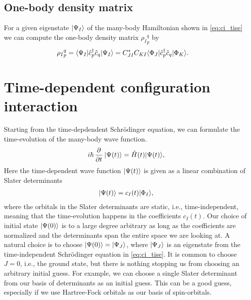         \subsection{One-body density matrix}
            For a given eigenstate $| \Psi_I \rangle$ of the many-body Hamiltonian
            shown in \autoref{eq:ci_tise} we can compute the one-body density
            matrix ${\rho_I}^{q}_{p}$ by
            \begin{align}
                {\rho_I}^{q}_{p}
                &= \langle \Psi_I |\hat{c}_{p}^{\dagger}\hat{c}_{q}| \Psi_I \rangle
                = C_{JI}^{*}C_{KI}\langle \Phi_J |\hat{c}_{p}^{\dagger}\hat{c}_{q}| \Phi_K \rangle.
            \end{align}

    \section{Time-dependent configuration interaction}
        Starting from the time-depdendent Schrödinger equation, we can formulate
        the time-evolution of the many-body wave function.
        \begin{align}
            i\hslash \dpd[]{}{t}\ket{\Psi(t)}
            = \hamil(t)\ket{\Psi(t)},
            \label{eq:ci_tdse}
        \end{align}
        Here the time-dependent wave function $| \Psi(t) \rangle$ is given as a
        linear combination of Slater determinants
        \begin{align}
            | \Psi(t) \rangle = c_{I}(t) | \Phi_I \rangle,
            \label{eq:ci_td_wave}
        \end{align}
        where the orbitals in the Slater determinants are static, i.e.,
        time-independent, meaning that the time-evolution happens in the
        coefficients $c_{I}(t)$.
        Our choice of initial state $| \Psi(0) \rangle$ is to a large degree
        arbitrary as long as the coefficients are normalized and the
        determinants span the entire space we are looking at.
        A natural choice is to choose $| \Psi(0) \rangle = | \Psi_J \rangle$, where
        $| \Psi_J \rangle$ is an eigenstate from the time-independent Schrödinger
        equation in \autoref{eq:ci_tise}.
        It is common to choose $J = 0$, i.e., the ground state, but there is
        nothing stopping us from choosing an arbitrary initial guess.
        For example, we can choose a single Slater determinant from our basis of
        determinants as an initial guess.
        This can be a good guess, especially if we use Hartree-Fock orbitals as
        our basis of spin-orbitals.

